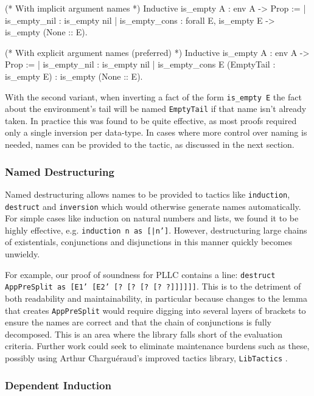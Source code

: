 \documentclass[]{unswthesis}
\let\c\texttt
\begin{document}
\newpage
\begin{coqcode}
(* With implicit argument names *)
Inductive is_empty {A} : env A -> Prop :=
  | is_empty_nil : is_empty nil
  | is_empty_cons : forall E, is_empty E -> is_empty (None :: E).

(* With explicit argument names (preferred) *)
Inductive is_empty {A} : env A -> Prop :=
  | is_empty_nil : is_empty nil
  | is_empty_cons E (EmptyTail : is_empty E) : is_empty (None :: E).
\end{coqcode}

With the second variant, when inverting a fact of the form \c{is_empty E} the fact about the environment's tail will be named \c{EmptyTail} if that name isn't already taken. In practice this was found to be quite effective, as most proofs required only a single inversion per data-type. In cases where more control over naming is needed, names can be provided to the tactic, as discussed in the next section.

\subsubsection{Named Destructuring}
\label{sec:named-destruct}

Named destructuring allows names to be provided to tactics like \c{induction}, \c{destruct} and \c{inversion} which would otherwise generate names automatically. For simple cases like induction on natural numbers and lists, we found it to be highly effective, e.g. \c{induction n as [|n']}. However, destructuring large chains of existentials, conjunctions and disjunctions in this manner quickly becomes unwieldy.

For example, our proof of soundness for PLLC contains a line: \c{destruct AppPreSplit as [E1' [E2' [? [? [? [? ?]]]]]]}. This is to the detriment of both readability and maintainability, in particular because changes to the lemma that creates \c{AppPreSplit} would require digging into several layers of brackets to ensure the names are correct and that the chain of conjunctions is fully decomposed. This is an area where the library falls short of the evaluation criteria. Further work could seek to eliminate maintenance burdens such as these, possibly using Arthur Charguéraud's improved tactics library, \c{LibTactics} \cite{tlc15}.

\subsubsection{Dependent Induction}
\end{document}
